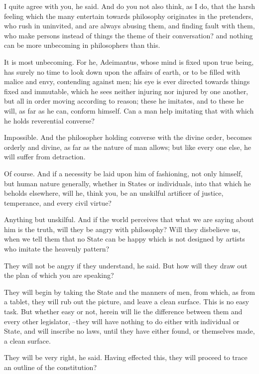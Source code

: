 I quite agree with you, he said.
And do you not also think, as I do, that the harsh feeling which the many entertain towards philosophy originates in the pretenders, who rush in uninvited, and are always abusing them, and finding fault with them, who make persons instead of things the theme of their conversation? and nothing can be more unbecoming in philosophers than this.

It is most unbecoming.
For he, Adeimantus, whose mind is fixed upon true being, has surely no time to look down upon the affairs of earth, or to be filled with malice and envy, contending against men; his eye is ever directed towards things fixed and immutable, which he sees neither injuring nor injured by one another, but all in order moving according to reason; these he imitates, and to these he will, as far as he can, conform himself. Can a man help imitating that with which he holds reverential converse?

Impossible.
And the philosopher holding converse with the divine order, becomes orderly and divine, as far as the nature of man allows; but like every one else, he will suffer from detraction.

Of course.
And if a necessity be laid upon him of fashioning, not only himself, but human nature generally, whether in States or individuals, into that which he beholds elsewhere, will he, think you, be an unskilful artificer of justice, temperance, and every civil virtue?

Anything but unskilful.
And if the world perceives that what we are saying about him is the truth, will they be angry with philosophy? Will they disbelieve us, when we tell them that no State can be happy which is not designed by artists who imitate the heavenly pattern?

They will not be angry if they understand, he said. But how will they draw out the plan of which you are speaking?

They will begin by taking the State and the manners of men, from which, as from a tablet, they will rub out the picture, and leave a clean surface. This is no easy task. But whether easy or not, herein will lie the difference between them and every other legislator, --they will have nothing to do either with individual or State, and will inscribe no laws, until they have either found, or themselves made, a clean surface.

They will be very right, he said.
Having effected this, they will proceed to trace an outline of the constitution?

